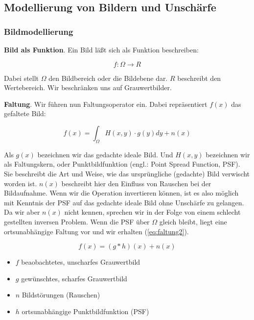 \documentclass[a4paper,12pt]{article}
\begin{document}
\subsection{Modellierung von Bildern und Unschärfe} \label{chp:einf_unschaerfe}

\subsubsection{Bildmodellierung}

\textbf{Bild als Funktion}. 
Ein Bild läßt sich als Funktion beschreiben:

\begin{equation} \label{eq:discrete}
f: \Omega \to R
\end{equation}


Dabei stellt $\Omega$ den Bildbereich oder die Bildebene dar.
$R$ beschreibt den Wertebereich. Wir beschränken uns auf Grauwertbilder. 


\textbf{Faltung}. Wir führen nun Faltungsoperator ein. Dabei repräsentiert
$f(x)$ das gefaltete Bild:

\begin{equation} \label{eq:faltung1}
f(x)=\int_\Omega{H(x,y) \cdot g(y)dy+n(x)}
\end{equation}

Als $g(x)$ bezeichnen wir das gedachte ideale Bild. Und $H(x,y)$ bezeichnen wir
als Faltungskern, oder Punktbildfunktion
(engl.: Point Spread Function, PSF). Sie beschreibt die Art und Weise, wie das
ursprüngliche (gedachte) Bild verwischt worden ist. $n(x)$ beschreibt
hier den Einfluss von Rauschen bei der Bildaufnahme. Wenn wir die Operation invertieren können, ist es also möglich
mit Kenntnis der PSF auf das gedachte ideale Bild ohne Unschärfe zu gelangen. Da
wir aber $n(x)$ nicht kennen, sprechen wir in der Folge von einem schlecht
gestellten inversen Problem.
Wenn die PSF über $\Omega$ gleich bleibt, liegt eine ortsunabhängige Faltung
vor und wir erhalten (\ref{eq:faltung2}).

\begin{equation} \label{eq:faltung2}
f(x)=(g*h)(x)+n(x)
\end{equation}

\begin{itemize}
  \itemsep -1pt
  \item $f$ beaobachtetes, unscharfes Grauwertbild
  \item $g$ gewünschtes, scharfes Grauwertbild
  \item $n$ Bildstörungen (Rauschen)
  \item $h$ ortsunabhängige Punktbildfunktion (PSF)
\end{itemize}
\end{document}
